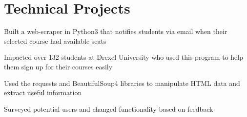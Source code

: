 \documentclass[]{deedy-resume-openfont}
\begin{document}
\begin{minipage}[t]{0.66\textwidth}



    \section{Technical Projects}
    \begin{tightemize}
        \item Built a web-scraper in Python3 that notifies students via email when their selected course had available seats
        \item Impacted over 132 students at Drexel University who used this program to help them sign up for their courses easily
        \item Used the requests and BeautifulSoup4 libraries to manipulate HTML data and extract useful information
        \item Surveyed potential users and changed functionality based on feedback
    \end{tightemize}
    \sectionsep


\end{minipage}
\end{document}
